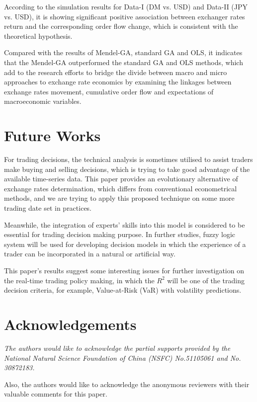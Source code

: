 According to the simulation results for Data-I (DM vs. USD) and
Data-II (JPY vs. USD), it is showing significant positive
association between exchanger rates return and the corresponding
order flow change, which is consistent with the theoretical
hypothesis.

Compared with the results of Mendel-GA, standard GA and OLS, it
indicates that the Mendel-GA outperformed the standard GA and OLS
methods, which add to the research efforts to bridge the divide
between macro and micro approaches to exchange rate economics by
examining the linkages between exchange rates movement, cumulative
order flow and expectations of macroeconomic variables.

\section{Future Works}

For trading decisions, the technical analysis is sometimes utilised
to assist traders make buying and selling decisions, which is trying
to take good advantage of the available time-series data. This paper
provides an evolutionary alternative of exchange rates
determination, which differs from conventional econometrical
methods, and we are trying to apply this proposed technique on some more trading date set in practices.

Meanwhile, the integration of experts' skills into this model is
considered to be essential for trading decision making purpose. In
further studies, fuzzy logic system will be used for developing
decision models in which the experience of a trader can be
incorporated in a natural or artificial way.

This paper's results suggest some interesting issues for further
investigation on the real-time trading policy making, in which the
$R^2$ will be one of the trading decision criteria, for example,
Value-at-Risk (VaR) with volatility predictions.



\section*{Acknowledgements}
{\it 
The authors would like to acknowledge the partial supports provided by 
the National Natural Science Foundation of China (NSFC) No.51105061 and No. 30872183. 

Also, the authors would like to acknowledge the anonymous reviewers
with their valuable comments for this paper. }


